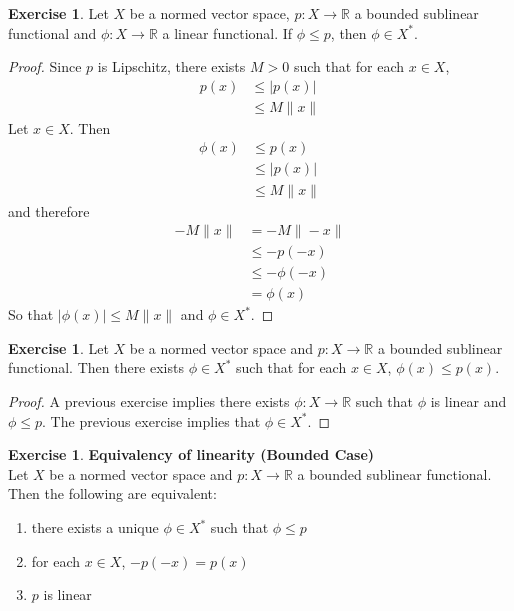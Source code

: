 \documentclass[12pt]{amsart}
\theoremstyle{definition}
\newtheorem{ex}[definition]{Exercise}
\newcommand{\R}{\mathbb{R}}
\newcommand{\tbf}[1]{\textbf{#1}}
\DeclareMathOperator*{\0}{\mbf{0}}
\DeclareMathOperator*{\1}{\mbf{1}}
\newcommand{\lex}[1]{\label{ex:#1}}
\begin{document}
	\begin{ex} \lex{55013}
	Let $X$ be a normed vector space, $p:X \rightarrow \R$ a bounded sublinear functional and $\phi:X \rightarrow \R$ a linear functional. If $\phi \leq p$, then $\phi \in X^*$. 
	\end{ex}
	
	\begin{proof}
	Since $p$ is Lipschitz, there exists $M >0$ such that for each $x \in X$, 
	\begin{align*}
	p(x) 
	&\leq |p(x)| \\
	&\leq M \|x\|
	\end{align*}
	Let $x \in X$. Then 
	\begin{align*}
	\phi(x) 
	&\leq p(x) \\
	&\leq |p(x)| \\
	&\leq M \|x\| 
	\end{align*}
	and therefore  
	\begin{align*}
	- M \|x\| 
	&= -M \|-x\| \\
	& \leq -p(-x) \\
	& \leq - \phi(-x) \\
	&= \phi(x) 
	\end{align*}
	So that $|\phi(x)| \leq  M\|x\|$ and $\phi \in X^*$.
	\end{proof}
	
	\begin{ex} \lex{55014}
	Let $X$ be a normed vector space and $p:X \rightarrow \R$ a bounded sublinear functional. Then there exists $\phi \in X^*$ such that for each $x \in X$, $\phi(x) \leq p(x)$.
	\end{ex}
	
	\begin{proof}
	A previous exercise implies there exists $\phi: X \rightarrow \R$ such that $\phi$ is linear and $\phi \leq p$. The previous exercise implies that $\phi \in X^*$.
	\end{proof}
	
	\begin{ex} \lex{55015} \tbf{Equivalency of linearity (Bounded Case)}\\
	Let $X$ be a normed vector space and $p:X \rightarrow \R$ a bounded sublinear functional. Then the following are equivalent:
	\begin{enumerate}
	\item there exists a unique $\phi \in X^*$ such that $\phi \leq p$
	\item for each $x \in X$, $-p(-x) = p(x)$
	\item $p$ is linear
\end{enumerate}	
	\end{ex}
	
\end{document}
